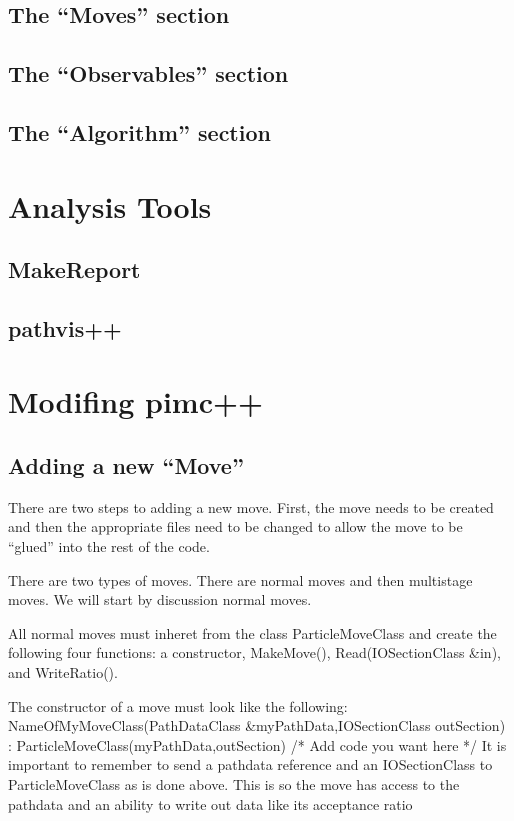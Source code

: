 \documentclass{book}
\begin{document}
\section{The ``Moves'' section}
\section{The ``Observables'' section}
\section{The ``Algorithm'' section}

\chapter{Analysis Tools}
\section{MakeReport}
\section{pathvis++}

\chapter{Modifing pimc++}
\section{Adding a new ``Move''}
There are two steps to adding a new move. First, the move needs to be
created and then the appropriate files need to be changed to allow the
move to be ``glued'' into the rest of the code.

There are two types of moves. There are normal moves and then
multistage moves. We will start by discussion normal moves.

All normal moves must inheret from the class ParticleMoveClass and 
create the following four functions: a
constructor, MakeMove(), Read(IOSectionClass &in),  and WriteRatio().

The constructor of a move must look like the following:\\
  NameOfMyMoveClass(PathDataClass &myPathData,IOSectionClass outSection) :
  ParticleMoveClass(myPathData,outSection)
    {
      /* Add code you want here */
    }
It is important to remember to send a pathdata reference and an
  IOSectionClass to ParticleMoveClass as is done above. This is so the
  move has access to the pathdata and an ability to write out data
  like its acceptance ratio
\end{document}

